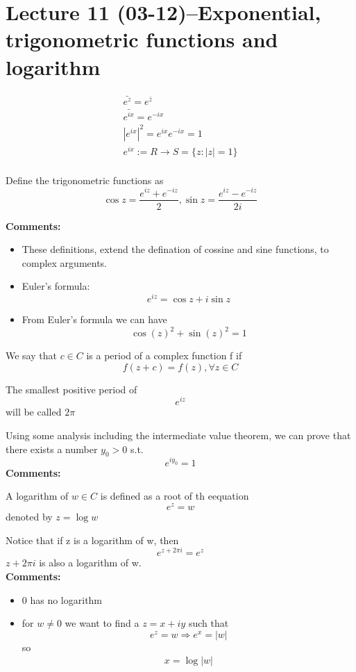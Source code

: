 \section{Lecture 11 (03-12)--{Exponential, trigonometric functions and logarithm}}
\begin{align*}{}{}
\bar{e^z}=e^{\bar{z}}\\
\bar{e^{ix}}=e^{-ix}\\
|e^{ix}|^2=e^{ix}e^{-ix}=1\\
e^{ix}:=R\rightarrow S=\{z:|z|=1\}\\
\end{align*}
\begin{definition}[]{}
Define the trigonometric functions as$$
    \cos z=\frac{e^{iz}+e^{-iz}}{2},\sin z=\frac{e^{iz}-e^{-iz}}{2i}
    $$
\end{definition}
\textbf{Comments:}
\begin{itemize}
\item These definitions, extend the defination of cossine and sine functions, to complex arguments.
\item Euler's formula:$$
    e^{iz}=\cos z+i\sin z
$$ 
\item From Euler's formula we can have $$
    \cos(z)^2+\sin(z)^2=1
$$ 
\end{itemize}
\begin{definition}{}
We say that $ c\in C $ is a period of a complex function f if $$
    f(z+c)=f(z),\forall z\in C
$$  
\end{definition}
\begin{definition}[]{}
The smallest positive period of $$
    e^{iz}
$$ will be called $ 2\pi $  
\end{definition}
Using some analysis including the intermediate value theorem, we can prove that there exists a number $ y_0>0 $ s.t.$$
    e^{iy_0}=1
$$  
\textbf{Comments:}
\begin{definition}[logarithm]{}
A logarithm of $ w\in C $ is defined as a root of th eequation$$
    e^z=w
$$  denoted by $ z=\log w $
\end{definition}
Notice that if z is a logarithm of w, then $$
    e^{z+2\pi i}=e^z
$$ $ z+2\pi i $ is also a logarithm of w.
\\\textbf{Comments:}
\begin{itemize}
\item 0 has no logarithm
\item for $ w\neq0 $ we want to find a $ z=x+iy $ such that $$
    e^z=w\Rightarrow e^x=|w|
$$ so\begin{align*}{}{}
x=\log|w|\\
\end{align*}
\end{itemize}


